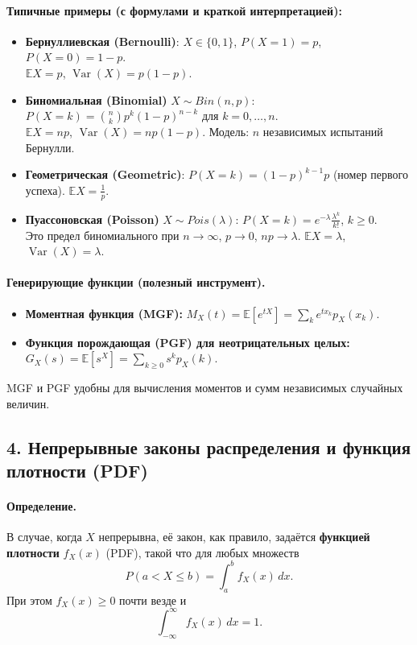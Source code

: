 \paragraph{Типичные примеры (с формулами и краткой интерпретацией):}
\begin{itemize}
  \item \textbf{Бернуллиевская (Bernoulli)}: $X\in\{0,1\}$, $P(X=1)=p$, $P(X=0)=1-p$. \\
    $\mathbb{E}X=p$, $\operatorname{Var}(X)=p(1-p)$.
  \item \textbf{Биномиальная (Binomial)} $X\sim Bin(n,p)$: $P(X=k)=\binom{n}{k}p^k(1-p)^{n-k}$ для $k=0,\dots,n$. \\
    $\mathbb{E}X=np$, $\operatorname{Var}(X)=np(1-p)$. Модель: $n$ независимых испытаний Бернулли.
  \item \textbf{Геометрическая (Geometric)}: $P(X=k)=(1-p)^{k-1}p$ (номер первого успеха). $\mathbb{E}X=\frac{1}{p}$.
  \item \textbf{Пуассоновская (Poisson)} $X\sim Pois(\lambda)$: $P(X=k)=e^{-\lambda}\frac{\lambda^k}{k!}$, $k\ge0$. \\
    Это предел биномиального при $n\to\infty$, $p\to0$, $np\to\lambda$. $\mathbb{E}X=\lambda$, $\operatorname{Var}(X)=\lambda$.
\end{itemize}

\paragraph{Генерирующие функции (полезный инструмент).}
\begin{itemize}
  \item \textbf{Моментная функция (MGF):} $M_X(t)=\mathbb{E}[e^{tX}] = \sum_k e^{t x_k} p_X(x_k)$.
  \item \textbf{Функция порождающая (PGF) для неотрицательных целых:} $G_X(s)=\mathbb{E}[s^X] = \sum_{k\ge0} s^k p_X(k)$.
\end{itemize}
MGF и PGF удобны для вычисления моментов и сумм независимых случайных величин.

\subsection*{4. Непрерывные законы распределения и функция плотности (PDF)}

\paragraph{Определение.} В случае, когда $X$ непрерывна, её закон, как правило, задаётся \textbf{функцией плотности} $f_X(x)$ (PDF), такой что для любых множеств
\[
P(a<X\le b) = \int_a^b f_X(x)\,dx.
\]
При этом $f_X(x)\ge0$ почти везде и
\[
\int_{-\infty}^{\infty} f_X(x)\,dx = 1.
\]

